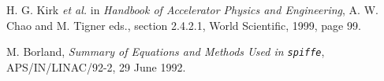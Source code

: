 \documentclass[11pt]{article}
\begin{document}




















\newpage
\begin{thebibliography}{1}

 H. G. Kirk {\em et al.} in {\em Handbook of Accelerator
Physics and Engineering}, A. W. Chao and M. Tigner eds., section 2.4.2.1,
World Scientific, 1999, page 99.

 M. Borland, {\em Summary of Equations and Methods
        Used in {\tt spiffe}}, APS/IN/LINAC/92-2, 29 June 1992.

\end{thebibliography}
\end{document}
